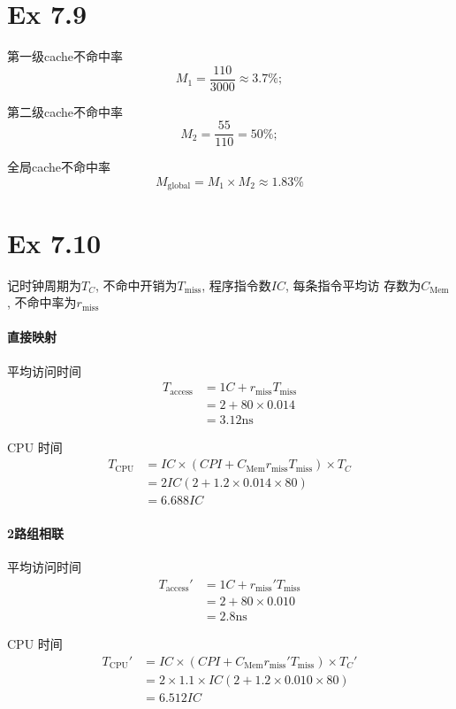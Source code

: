 \newcommand{\doctitle}{计算机系统结构第四次作业}


\section{Ex 7.9}

\begin{solve}
  第一级cache不命中率
  \[M_1 = \frac{110}{3000} \approx 3.7 \% ;\]

  第二级cache不命中率
  \[M_2 = \frac{55}{110} = 50 \% ;\]

  全局cache不命中率
  \[M_{\mathrm{global}} = M_1 \times M_2 \approx 1.83 \% \]
\end{solve}

\section{Ex 7.10}

\begin{solve}
  记时钟周期为$T_C$, 不命中开销为$T_{\mathrm{miss}}$, 程序指令数$IC$, 每条指令平均访
  存数为$C_{\mathrm{Mem}}$, 不命中率为$r_{\mathrm{miss}}$

  \paragraph{直接映射}
  
  平均访问时间
  \begin{align*}
    T_{\mathrm{access}} &= 1C + r_{\mathrm{miss}}T_{\mathrm{miss}} \\
    &= 2 + 80 \times 0.014\\
    &= 3.12 \mathrm{ns}
  \end{align*}

  CPU 时间
  \begin{align*}
    T_{\mathrm{CPU}} &= IC \times (CPI + C_{\mathrm{Mem}}
    r_{\mathrm{miss}}
    T_{\mathrm{miss}}) \times T_C\\
    &= 2IC(2 + 1.2 \times 0.014 \times 80)\\
    &= 6.688IC
  \end{align*}
  
  \paragraph{2路组相联}
  平均访问时间
  \begin{align*}
    T_{\mathrm{access}}' &= 1C + r_{\mathrm{miss}}'T_{\mathrm{miss}} \\
    &= 2 + 80 \times 0.010\\
    &= 2.8 \mathrm{ns}
  \end{align*}

  CPU 时间
  \begin{align*}
    T_{\mathrm{CPU}}' &= IC \times (CPI + C_{\mathrm{Mem}}
    r_{\mathrm{miss}}'
    T_{\mathrm{miss}}) \times T_C'\\
    &= 2 \times 1.1 \times IC(2 + 1.2 \times 0.010 \times 80)\\
    &= 6.512IC
  \end{align*}
\end{solve}

